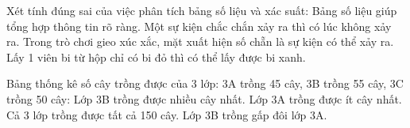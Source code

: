 \begin{ex} %
Xét tính đúng sai của việc phân tích bảng số liệu và xác suất:
\choiceTF
{\True Bảng số liệu giúp tổng hợp thông tin rõ ràng.}
{Một sự kiện chắc chắn xảy ra thì có lúc không xảy ra.}
{\True Trong trò chơi gieo xúc xắc, mặt xuất hiện số chẵn là sự kiện có thể xảy ra.}
{Lấy 1 viên bi từ hộp chỉ có bi đỏ thì có thể lấy được bi xanh.}
\end{ex}

\begin{ex} %
Bảng thống kê số cây trồng được của 3 lớp: 3A trồng 45 cây, 3B trồng 55 cây, 3C trồng 50 cây:
\choiceTF
{\True Lớp 3B trồng được nhiều cây nhất.}
{\True Lớp 3A trồng được ít cây nhất.}
{\True Cả 3 lớp trồng được tất cả 150 cây.}
{Lớp 3B trồng gấp đôi lớp 3A.}
\end{ex}

